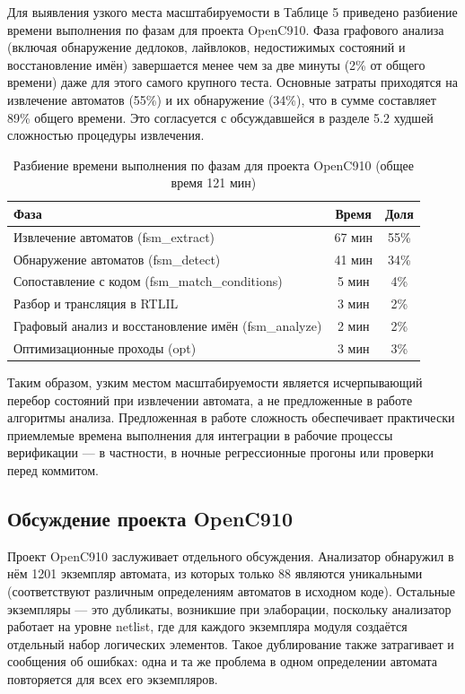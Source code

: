 Для выявления узкого места масштабируемости в Таблице 5 приведено разбиение времени выполнения по фазам
для проекта OpenC910. Фаза графового анализа (включая обнаружение дедлоков, лайвлоков, недостижимых
состояний и восстановление имён) завершается менее чем за две минуты (2\% от общего времени) даже для
этого самого крупного теста. Основные затраты приходятся на извлечение автоматов (55\%) и их обнаружение
(34\%), что в сумме составляет 89\% общего времени. Это согласуется с обсуждавшейся в разделе 5.2
худшей сложностью процедуры извлечения.

\begin{table}[h]
    \centering
    \caption{Разбиение времени выполнения по фазам для проекта OpenC910 (общее время 121 мин)}
    \label{tab:perf2}
    \begin{tabular}{|l|c|c|}
        \hline
        \textbf{Фаза} & \textbf{Время} & \textbf{Доля} \\
        \hline
        Извлечение автоматов (fsm\_extract) & 67 мин & 55\% \\
        Обнаружение автоматов (fsm\_detect) & 41 мин & 34\% \\
        Сопоставление с кодом (fsm\_match\_conditions) & 5 мин & 4\% \\
        Разбор и трансляция в RTLIL & 3 мин & 2\% \\
        Графовый анализ и восстановление имён (fsm\_analyze) & 2 мин & 2\% \\
        Оптимизационные проходы (opt) & 3 мин & 3\% \\
        \hline
    \end{tabular}
\end{table}

Таким образом, узким местом масштабируемости является исчерпывающий перебор состояний при извлечении
автомата, а не предложенные в работе алгоритмы анализа. Предложенная в работе сложность обеспечивает
практически приемлемые времена выполнения для интеграции в рабочие процессы верификации — в частности,
в ночные регрессионные прогоны или проверки перед коммитом.

\subsection{Обсуждение проекта OpenC910}

Проект OpenC910 заслуживает отдельного обсуждения. Анализатор обнаружил в нём 1201 экземпляр автомата, из
которых только 88 являются уникальными (соответствуют различным определениям автоматов в исходном коде).
Остальные экземпляры — это дубликаты, возникшие при элаборации, поскольку анализатор работает на уровне
netlist, где для каждого экземпляра модуля создаётся отдельный набор логических элементов. Такое
дублирование также затрагивает и сообщения об ошибках: одна и та же проблема в одном определении
автомата повторяется для всех его экземпляров.

